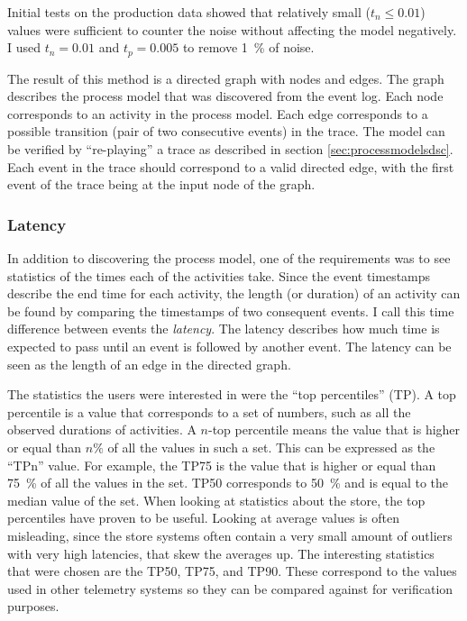 Initial tests on the production data showed that relatively small ($t_n \le 0.01$) values were sufficient to counter the noise without affecting the model negatively. 
I used $t_n = 0.01$ and $t_p = 0.005$ to remove 1~\% of noise.


The result of this method is a directed graph with nodes and edges.
The graph describes the process model that was discovered from the event log.
Each node corresponds to an activity in the process model.
Each edge corresponds to a possible transition (pair of two consecutive events) in the trace.
The model can be verified by ``re-playing'' a trace as described in section \ref{sec:processmodelsdsc}.
Each event in the trace should correspond to a valid directed edge, with the first event of the trace being at the input node of the graph.

\subsubsection{Latency}
\label{sec:latency}

In addition to discovering the process model, one of the requirements was to see statistics of the times each of the activities take. 
Since the event timestamps describe the end time for each activity, the length (or duration) of an activity can be found by comparing the timestamps of two consequent events. 
I call this time difference between events the \emph{latency}.
The latency describes how much time is expected to pass until an event is followed by another event.
The latency can be seen as the length of an edge in the directed graph.

The statistics the users were interested in were the ``top percentiles'' (TP).
A top percentile is a value that corresponds to a set of numbers, such as all the observed durations of activities.
A $n$-top percentile means the value that is higher or equal than $n\%$ of all the values in such a set.
This can be expressed as the ``TPn'' value.
For example, the TP75 is the value that is higher or equal than 75~\% of all the values in the set.
TP50 corresponds to 50~\% and is equal to the median value of the set.
When looking at statistics about the store, the top percentiles have proven to be useful.
Looking at average values is often misleading, since the store systems often contain a very small amount of outliers with very high latencies, that skew the averages up.
The interesting statistics that were chosen are the TP50, TP75, and TP90. 
These correspond to the values used in other telemetry systems so they can be compared against for verification purposes.

